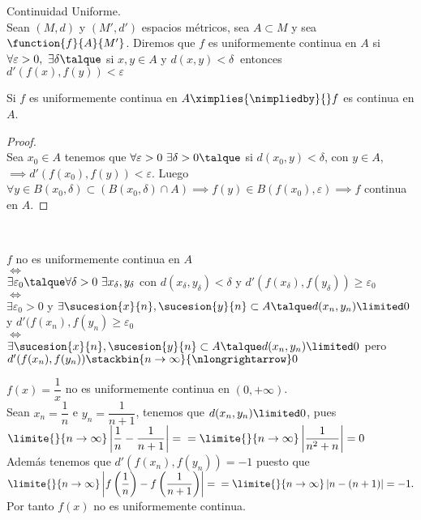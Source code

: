 	\begin{defi} Continuidad Uniforme.\\
	Sean $(M,d)$ y $(M',d')$ espacios métricos, sea $A\subset M$ y sea $\function{f}{A}{M'}$. Diremos que $f$ es uniformemente continua en $A$ si $\forall\varepsilon>0,\ \exists\delta\talque$ si $x,y\in A$ y $d(x,y)<\delta\ $ entonces\\ $d'(f(x),f(y))<\varepsilon$
	\begin{proposicion}Si $f$ es uniformemente continua en $A\ximplies{\nimpliedby}{} f$ es continua en $A$.
	\begin{proof}\ \\
	Sea $x_0\in A$ tenemos que $\forall\varepsilon>0\ \exists\delta >0\talque$ si $d(x_0,y)<\delta$, con $y\in A$, $\implies d'(f(x_0),f(y))<\varepsilon$. Luego $\forall y\in B(x_0,\delta)\subset (B(x_0,\delta)\cap A)\implies f(y)\in B(f(x_0),\varepsilon)\implies f$ continua en $A$.	
	\end{proof}
	\end{proposicion}
	\begin{observacion}\  
	\begin{center}
	$f$ no es uniformemente continua en $A$\\
	$\iff$\\
	$\exists \varepsilon_0\talque \forall\delta >0\ \exists x_\delta,y_\delta$ con $d(x_\delta,y_\delta)<\delta$ y $d'(f(x_\delta),f(y_\delta))\geq\varepsilon_0$\\$\iff$\\
	$\exists \varepsilon_0>0$ y $\exists\sucesion{x}{n},\sucesion{y}{n}\subset A\talque d(x_n,y_n)\limited 0$ y $d'(f(x_n),f(y_n)\geq\varepsilon_0$\\$\iff$\\
	$\exists\sucesion{x}{n},\sucesion{y}{n}\subset A\talque d(x_n,y_n)\limited 0$ pero $d'(f(x_n),f(y_n))\stackbin{n\rightarrow\infty}{\nlongrightarrow} 0$
	\end{center}
	\begin{ejem} $f(x)=\dfrac{1}{x}$ no es uniformemente continua en $(0,+\infty)$.\\
	Sean $x_n=\dfrac{1}{n}$ e $y_n=\dfrac{1}{n+1}$, tenemos que $d(x_n,y_n)\limited 0$, pues $\limite{}{n\rightarrow\infty}\left|\dfrac{1}{n}-\dfrac{1}{n+1}\right|=\\=\limite{}{n\rightarrow\infty}\left|\dfrac{1}{n^2+n}\right|=0$\\
	Además tenemos que $d'(f(x_n),f(y_n))=-1$ puesto que $\limite{}{n\rightarrow\infty}\left|f\left(\dfrac{1}{n}\right)-f\left(\dfrac{1}{n+1}\right)\right|=\\=\limite{}{n\rightarrow\infty}\left|n-(n+1)\right|=-1.$ Por tanto $f(x)$ no es uniformemente continua.
	\end{ejem}
	\end{observacion}
	\end{defi}
	
